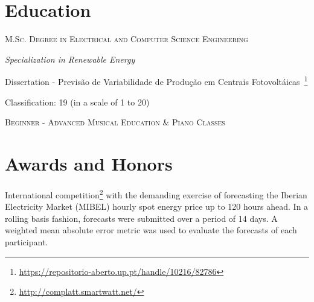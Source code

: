 \documentclass{mycv}
\begin{document}

\vspace{0.3cm}

\section{Education}{

\textsc{M.Sc. Degree in Electrical and Computer Science Engineering}

\textit{Specialization in Renewable Energy}

\begin{myitemize}
	\item Dissertation - Previs\~{a}o de Variabilidade de Produ\c{c}\~{a}o em Centrais Fotovolt\'{a}icas~\footnote{\url{https://repositorio-aberto.up.pt/handle/10216/82786}}
	\begin{myitemize}
		\item Classification: 19 (in a scale of 1 to 20)
	\end{myitemize}
\end{myitemize}


\vspace{0.05cm}

\textsc{Beginner - Advanced Musical Education \& Piano Classes}


\vspace{0.3cm}

\pagebreak

\section{Awards and Honors}



International competition\footnote{\url{http://complatt.smartwatt.net/}} with the demanding exercise of forecasting the Iberian Electricity Market (MIBEL) hourly spot energy price up to 120 hours ahead. In a rolling basis fashion, forecasts were submitted over a period of 14 days. A weighted mean absolute error metric was used to evaluate the forecasts of each participant.

}
\end{document}
